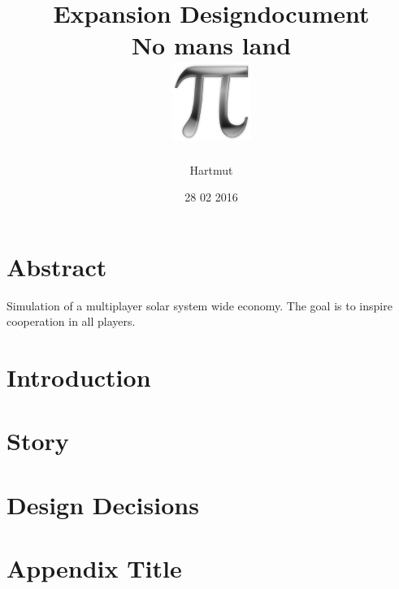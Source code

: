 \documentclass[a4paper,10pt]{book}
\title{
	{Expansion Designdocument}\\
	{\large No mans land}\\
	{\includegraphics{pi-black.png}}
}
\author{Hartmut}
\date{28 02 2016}
\begin{document}
\maketitle

\chapter*{Abstract}
Simulation of a multiplayer solar system wide economy. The goal is to inspire cooperation in all players.

\tableofcontents
\chapter{Introduction}

\chapter{Story}


\chapter{Design Decisions}


\appendix
\chapter{Appendix Title}

\end{document}

